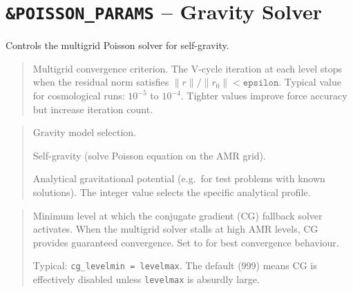 \section{\texttt{\&POISSON\_PARAMS} -- Gravity Solver}
\label{sec:poisson_params}

Controls the multigrid Poisson solver for self-gravity.

\label{param:epsilon}

\begin{quote}
Multigrid convergence criterion.  The V-cycle iteration at each level
stops when the residual norm satisfies
$\|r\| / \|r_0\| < \texttt{epsilon}$.
Typical value for cosmological runs: $10^{-5}$ to $10^{-4}$.
Tighter values improve force accuracy but increase iteration count.
\end{quote}

\label{param:gravity_type}

\begin{quote}
Gravity model selection.
\begin{description}[style=nextline,leftmargin=1.5cm,font=\ttfamily]
  \item[0] Self-gravity (solve Poisson equation on the AMR grid).
  \item[>0] Analytical gravitational potential (e.g.\ for test
    problems with known solutions).  The integer value selects the
    specific analytical profile.
\end{description}
\end{quote}

\label{param:cg_levelmin}

\begin{quote}
Minimum level at which the conjugate gradient (CG) fallback solver
activates.  When the multigrid solver stalls at high AMR levels, CG
provides guaranteed convergence.  Set to  for
best convergence behaviour.

Typical: \texttt{cg\_levelmin = levelmax}.  The default (999) means
CG is effectively disabled unless \texttt{levelmax} is absurdly
large.
\end{quote}

